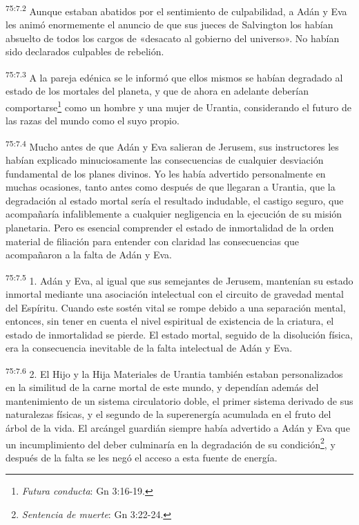 \par
\textsuperscript{75:7.2} Aunque estaban abatidos por el sentimiento de culpabilidad, a Adán y Eva les animó enormemente el anuncio de que sus jueces de Salvington los habían absuelto de todos los cargos de «desacato al gobierno del universo». No habían sido declarados culpables de rebelión.

\par
\textsuperscript{75:7.3} A la pareja edénica se le informó que ellos mismos se habían degradado al estado de los mortales del planeta, y que de ahora en adelante deberían comportarse\footnote{\textit{Futura conducta}: Gn 3:16-19.} como un hombre y una mujer de Urantia, considerando el futuro de las razas del mundo como el suyo propio.

\par
\textsuperscript{75:7.4} Mucho antes de que Adán y Eva salieran de Jerusem, sus instructores les habían explicado minuciosamente las consecuencias de cualquier desviación fundamental de los planes divinos. Yo les había advertido personalmente en muchas ocasiones, tanto antes como después de que llegaran a Urantia, que la degradación al estado mortal sería el resultado indudable, el castigo seguro, que acompañaría infaliblemente a cualquier negligencia en la ejecución de su misión planetaria. Pero es esencial comprender el estado de inmortalidad de la orden material de filiación para entender con claridad las consecuencias que acompañaron a la falta de Adán y Eva.

\par
\textsuperscript{75:7.5} 1. Adán y Eva, al igual que sus semejantes de Jerusem, mantenían su estado inmortal mediante una asociación intelectual con el circuito de gravedad mental del Espíritu. Cuando este sostén vital se rompe debido a una separación mental, entonces, sin tener en cuenta el nivel espiritual de existencia de la criatura, el estado de inmortalidad se pierde. El estado mortal, seguido de la disolución física, era la consecuencia inevitable de la falta intelectual de Adán y Eva.

\par
\textsuperscript{75:7.6} 2. El Hijo y la Hija Materiales de Urantia también estaban personalizados en la similitud de la carne mortal de este mundo, y dependían además del mantenimiento de un sistema circulatorio doble, el primer sistema derivado de sus naturalezas físicas, y el segundo de la superenergía acumulada en el fruto del árbol de la vida. El arcángel guardián siempre había advertido a Adán y Eva que un incumplimiento del deber culminaría en la degradación de su condición\footnote{\textit{Sentencia de muerte}: Gn 3:22-24.}, y después de la falta se les negó el acceso a esta fuente de energía.

